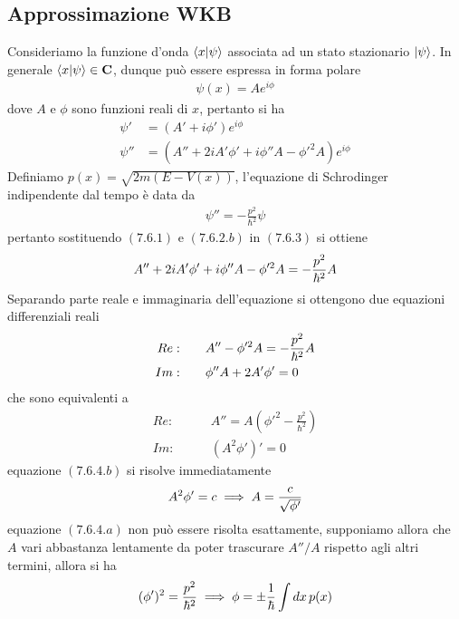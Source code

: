 \documentclass{article}
\begin{document}
\subsection{Approssimazione WKB}
Consideriamo la funzione d'onda $\braket{x|\psi}$ associata ad un stato stazionario $\ket{\psi}$. In generale $\braket{x|\psi} \in \mathbf{C}$, dunque può essere espressa in forma polare
\begin{gather}
    \psi(x) = Ae^{i\phi} \tag{7.6.1}
\end{gather}
dove $A$ e $\phi$ sono funzioni reali di $x$, pertanto si ha
\begin{align}
    \psi' &= (A' + i\phi')e^{i\phi} \tag{7.6.2.a} \\
    \psi'' &= (A'' + 2iA'\phi' + i\phi''A - \phi'^2A)e^{i\phi} \tag{7.6.2.b}
\end{align}
Definiamo $p(x) = \sqrt{2m(E - V(x))}$, l'equazione di Schrodinger indipendente dal tempo è data da
\begin{gather}
    \psi'' = -\frac{p^2}{\hbar^2}\psi \tag{7.6.3}
\end{gather}
pertanto sostituendo $(7.6.1)$ e $(7.6.2.b)$ in $(7.6.3)$ si ottiene
\begin{gather}
    A'' + 2iA'\phi' + i\phi''A - \phi'^2A = -\frac{p^2}{\hbar^2}A \notag
\end{gather}
Separando parte reale e immaginaria dell'equazione si ottengono due equazioni differenziali reali
\begin{align}
    Re:& \qquad A'' - \phi'^2A = -\frac{p^2}{\hbar^2}A \notag \\
    Im:& \qquad \phi''A + 2A'\phi' = 0 \notag
\end{align}
che sono equivalenti a
\begin{align}
    Re:& \qquad A'' = A\left( \phi'^2 - \frac{p^2}{\hbar^2} \right) \tag{7.6.4.a} \\
    Im:& \qquad \left( A^2\phi' \right)' = 0 \tag{7.6.4.b}
\end{align}
equazione $(7.6.4.b)$ si risolve immediatamente
\begin{gather}
    A^2\phi' = c \implies A = \frac{c}{\sqrt{\phi'}} \notag
\end{gather}
equazione $(7.6.4.a)$ non può essere risolta esattamente, supponiamo allora che $A$ vari abbastanza lentamente da poter trascurare $A''/A$ rispetto agli altri termini, allora si ha
\begin{gather}
    (\phi')^2 = \frac{p^2}{\hbar^2} \implies \phi = \pm\frac{1}{\hbar}\int dx \, p(x) \notag
\end{gather}
\end{document}
